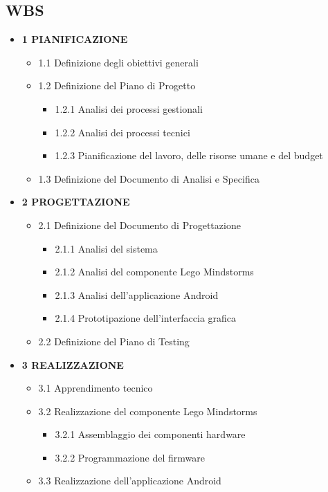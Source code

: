 \documentclass{article}
\begin{document}
\subsection{WBS}

\begin{itemize}
\item
\textbf{1 PIANIFICAZIONE}

\begin{itemize}
\item
1.1 Definizione degli obiettivi generali
\item
1.2 Definizione del Piano di Progetto

\begin{itemize}
\item
1.2.1 Analisi dei processi gestionali
\item
1.2.2 Analisi dei processi tecnici
\item
1.2.3 Pianificazione del lavoro, delle risorse umane e del budget
\end{itemize}
\item
1.3 Definizione del Documento di Analisi e Specifica
\end{itemize}
\item
\textbf{2 PROGETTAZIONE}

\begin{itemize}
\item
2.1 Definizione del Documento di Progettazione

\begin{itemize}
\item
2.1.1 Analisi del sistema
\item
2.1.2 Analisi del componente Lego Mindstorms
\item
2.1.3 Analisi dell'applicazione Android
\item
2.1.4 Prototipazione dell'interfaccia grafica
\end{itemize}
\item
2.2 Definizione del Piano di Testing
\end{itemize}
\item
\textbf{3 REALIZZAZIONE}

\begin{itemize}
\item
3.1 Apprendimento tecnico
\item
3.2 Realizzazione del componente Lego Mindstorms

\begin{itemize}
\item
3.2.1 Assemblaggio dei componenti hardware
\item
3.2.2 Programmazione del firmware
\end{itemize}
\item
3.3 Realizzazione dell'applicazione Android


\end{itemize}
\end{itemize}
\end{document}
